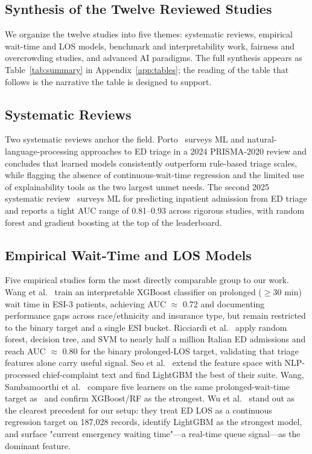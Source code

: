 \documentclass[conference]{IEEEtran}
\begin{document}
\subsection{Synthesis of the Twelve Reviewed Studies}
We organize the twelve studies into five themes: systematic reviews,
empirical wait-time and LOS models, benchmark and interpretability work,
fairness and overcrowding studies, and advanced AI paradigms. The full
synthesis appears as Table~\ref{tab:summary} in
Appendix~\ref{app:tables}; the reading of the table that follows is the
narrative the table is designed to support.

\subsection{Systematic Reviews}
Two systematic reviews anchor the field. Porto~\cite{porto2024} surveys ML
and natural-language-processing approaches to ED triage in a 2024
PRISMA-2020 review and concludes that learned models consistently outperform
rule-based triage scales, while flagging the absence of continuous-wait-time
regression and the limited use of explainability tools as the two largest
unmet needs. The second 2025 systematic review~\cite{slr2025} surveys ML for
predicting inpatient admission from ED triage and reports a tight AUC range
of 0.81--0.93 across rigorous studies, with random forest and gradient
boosting at the top of the leaderboard.

\subsection{Empirical Wait-Time and LOS Models}
Five empirical studies form the most directly comparable group to our work.
Wang et al.~\cite{wang2025fair} train an interpretable XGBoost classifier on
prolonged ($\geq$30 min) wait time in ESI-3 patients, achieving AUC $\approx$
0.72 and documenting performance gaps across race/ethnicity and insurance
type, but remain restricted to the binary target and a single ESI bucket.
Ricciardi et al.~\cite{ricciardi2024} apply random forest, decision tree, and
SVM to nearly half a million Italian ED admissions and reach AUC $\approx$
0.80 for the binary prolonged-LOS target, validating that triage features
alone carry useful signal. Seo et al.~\cite{seo2024} extend the feature space
with NLP-processed chief-complaint text and find LightGBM the best of their
suite. Wang, Sambamoorthi et al.~\cite{wang2025interp} compare five learners
on the same prolonged-wait-time target as~\cite{wang2025fair} and confirm
XGBoost/RF as the strongest. Wu et al.~\cite{wu2025} stand out as the
clearest precedent for our setup: they treat ED LOS as a continuous
regression target on 187{,}028 records, identify LightGBM as the strongest
model, and surface "current emergency waiting time"---a real-time queue
signal---as the dominant feature.
\end{document}
